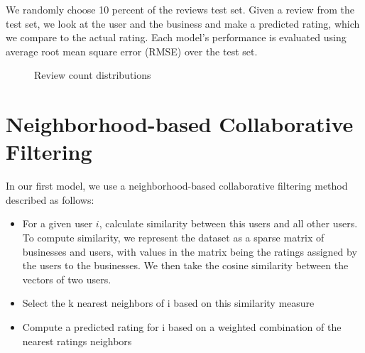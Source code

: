 \documentclass[10pt, letterpaper]{article}
\begin{document}
We randomly choose 10 percent of the reviews test set. Given a review 
from the test set, we look at the user and the business and make a predicted 
rating, which we compare to the actual rating. Each model's performance is 
evaluated using average root mean square error (RMSE) over the test set.


\begin{figure}[htb]
  \centering

            \caption{Review count distributions}
            \label{review_count}

\end{figure}

\section{Neighborhood-based Collaborative Filtering}
In our first model, we use a neighborhood-based collaborative filtering method 
described as follows:
\begin{itemize}
\item For a given user $i$, calculate similarity between this users and all other
users. To compute similarity, we represent the dataset as a sparse matrix
of businesses and users, with values in the matrix being the ratings
assigned by the users to the businesses. We then take the cosine similarity
between the vectors of two users.
\item Select the k nearest neighbors of i based on this similarity measure
\item Compute a predicted rating for i based on a weighted combination of the
  nearest ratings neighbors
\end{itemize}
\end{document}
